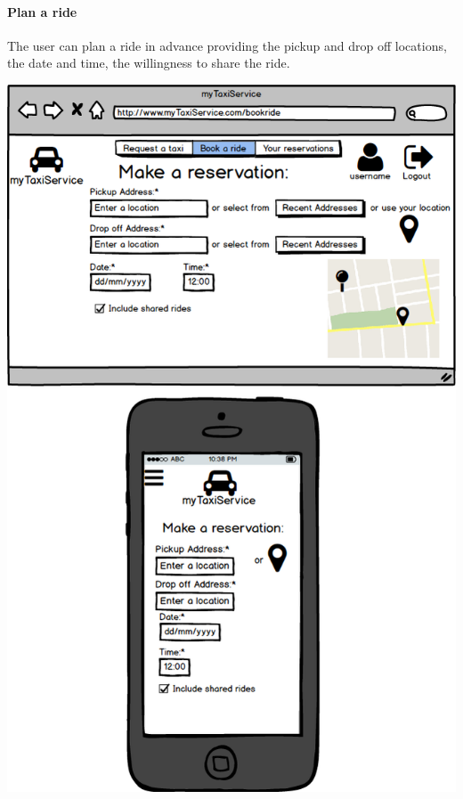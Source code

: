 \documentclass[a4paper,11pt]{report} %
\begin{document}
	\paragraph{Plan a ride} The user can plan a ride in advance providing the pickup and drop off locations, the date and time, the willingness to share the ride.
	\begin{center}
		\includegraphics[width=0.9\linewidth]{Pictures/PlanAndBookARide}
	\end{center}
	\pagebreak
	
\end{document}

